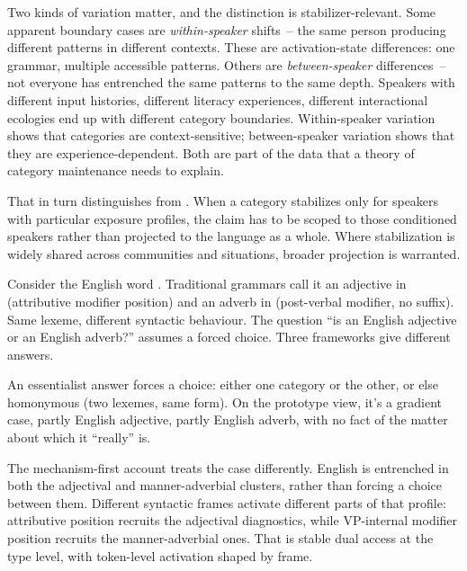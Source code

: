 Two kinds of variation matter, and the distinction is stabilizer-relevant. Some apparent boundary cases are \emph{within-speaker} shifts~-- the same person producing different patterns in different contexts. These are activation-state differences: one grammar, multiple accessible patterns. Others are \emph{between-speaker} differences~-- not everyone has entrenched the same patterns to the same depth. Speakers with different input histories, different literacy experiences, different interactional ecologies end up with different category boundaries. Within-speaker variation shows that categories are context-sensitive; between-speaker variation shows that they are experience-dependent. Both are part of the data that a theory of category maintenance needs to explain.

That in turn distinguishes  from . When a category stabilizes only for speakers with particular exposure profiles, the claim has to be scoped to those conditioned speakers rather than projected to the language as a whole. Where stabilization is widely shared across communities and situations, broader projection is warranted.

Consider the English word . Traditional grammars call it an adjective in  (attributive modifier position) and an adverb in  (post-verbal modifier, no  suffix). Same lexeme, different syntactic behaviour. The question \enquote{is  an English adjective or an English adverb?} assumes a forced choice. Three frameworks give different answers.

An essentialist answer forces a choice: either one category or the other, or else homonymous (two lexemes, same form). On the prototype view, it's a gradient case, partly English adjective, partly English adverb, with no fact of the matter about which it \enquote{really} is.

The mechanism-first account treats the case differently. English  is entrenched in both the adjectival and manner-adverbial clusters, rather than forcing a choice between them. Different syntactic frames activate different parts of that profile: attributive position recruits the adjectival diagnostics, while VP-internal modifier position recruits the manner-adverbial ones. That is stable dual access at the type level, with token-level activation shaped by frame.

